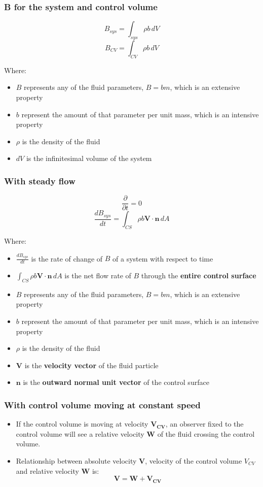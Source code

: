 \documentclass[11pt]{article}
\begin{document}
\subsubsection{B for the system and control volume}
\label{sec:org94ef0e8}
\[B_{sys} = \int_{sys} \rho b \, dV\]
\[B_{CV} = \int_{CV} \rho b \, dV\]

Where:
\begin{itemize}
\item \(B\) represents any of the fluid parameters, \(B = bm\), which is an extensive property
\item \(b\) represent the amount of that parameter per unit mass, which is an intensive property
\item \(\rho\) is the density of the fluid
\item \(dV\) is the infinitesimal volume of the system
\end{itemize}
\subsubsection{With steady flow}
\label{sec:org0c551fd}
\[\frac{\partial}{\partial t} = 0\]
\[\frac{dB_{sys}}{dt} = \int_{CS} \rho b \boldsymbol{V} \cdot \boldsymbol{n} \, dA\]

Where:
\begin{itemize}
\item \(\frac{dB_{sys}}{dt}\) is the rate of change of \(B\) of a system with respect to time
\item \(\int_{CS} \rho b \boldsymbol{V} \cdot \boldsymbol{n} \, dA\) is the net flow rate of \(B\) through the \textbf{entire control surface}
\item \(B\) represents any of the fluid parameters, \(B = bm\), which is an extensive property
\item \(b\) represent the amount of that parameter per unit mass, which is an intensive property
\item \(\rho\) is the density of the fluid
\item \(\boldsymbol{V}\) is the \textbf{velocity vector} of the fluid particle
\item \(\boldsymbol{n}\) is the \textbf{outward normal unit vector} of the control surface
\end{itemize}

\newpage
\subsubsection{With control volume moving at constant speed}
\label{sec:org7a9e775}
\begin{itemize}
\item If the control volume is moving at velocity \(\boldsymbol{V_{CV}}\), an observer fixed to the control volume will see a relative velocity \(\boldsymbol{W}\) of the fluid crossing the control volume.
\item Relationship between absolute velocity \(\boldsymbol{V}\), velocity of the control volume \(V_{CV}\) and relative velocity \(\boldsymbol{W}\) is:
\[\boldsymbol{V} = \boldsymbol{W} + \boldsymbol{V_{CV}}\]
\end{itemize}
\end{document}
